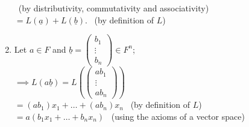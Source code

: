 \documentclass[
  12pt,
  a4paper,
  twoside]{article}
\theoremstyle{plain}
\theoremstyle{definition}
\begin{document}
\begin{enumerate}
  \hspace*{0.333em}\hfill~{(by distributivity, commutativity and associativity)}\\
  \hspace*{0.333em}\hspace*{0.333em}\hspace*{0.333em}\hspace*{0.333em}\hspace*{0.333em}\hspace*{0.333em}\hspace*{0.333em}\hspace*{0.333em}\hspace*{0.333em}\hspace*{0.333em}\hspace*{0.333em}\hspace*{0.333em} \(= L(\underline{a}) + L(\underline{b}).\) \hfill~{(by definition of \(L\))}
\item
  Let \(a \in F\) and \(\underline{b} = \begin{pmatrix} b_{1} \\ \vdots \\ b_{n} \end{pmatrix} \in F^{n}\);\\
  \(\implies L(a \underline{b}) = L \left( \begin{pmatrix} a b_{1} \\ \vdots \\ a b_{n} \end{pmatrix} \right)\)\\
  \hspace*{0.333em}\hspace*{0.333em}\hspace*{0.333em}\hspace*{0.333em}\hspace*{0.333em}\hspace*{0.333em}\hspace*{0.333em}\hspace*{0.333em}\hspace*{0.333em}\hspace*{0.333em}\hspace*{0.333em}\hspace*{0.333em} \(= (a b_{1})x_{1} + \dots + (a b_{n})x_{n}\) \hfill~{(by definition of \(L\))}\\
  \hspace*{0.333em}\hspace*{0.333em}\hspace*{0.333em}\hspace*{0.333em}\hspace*{0.333em}\hspace*{0.333em}\hspace*{0.333em}\hspace*{0.333em}\hspace*{0.333em}\hspace*{0.333em}\hspace*{0.333em}\hspace*{0.333em} \(= a(b_{1}x_{1} + \dots + b_{n}x_{n})\) \hfill~{(using the axioms of a vector space)}\\

\end{enumerate}
\end{document}
